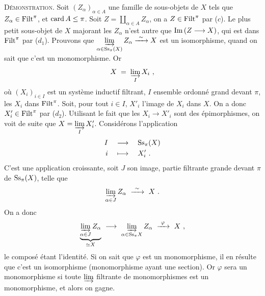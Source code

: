 \textsc{Démonstration}. Soit $(Z_{\alpha})_{\alpha\in A}$ une famille de sous-objets de $X$ tels que $Z_{\alpha} \in \mathrm{Filt}^{\pi}$, et $\operatorname{card} A \leq \pi$. Soit $Z = \coprod_{\alpha\in A} Z_{\alpha}$, on a $Z \in \mathrm{Filt}^{\pi}$ par ($c$). Le plus petit sous-objet de $X$ majorant les $Z_{\alpha}$ n'est autre que $\mathrm{Im}\, (Z \longrightarrow X)$, qui est dans $\mathrm{Filt}^{\pi}$ par ($d_1$). Prouvons que $\varinjlim\limits_{\alpha\in\mathrm{Ss}_{\pi}(X)} Z_{\alpha} \xrightarrow{\ \sim\ } X$ est un isomorphisme, quand on sait que c'est un monomorphisme. Or
\[
X \;=\; \varinjlim_{I} X_i \ ,
\]
où $(X_i)_{i\in I}$ est un système inductif filtrant, $I$ ensemble ordonné grand devant $\pi$, les $X_i$ dans $\mathrm{Filt}^{\pi}$. Soit, pour tout $i \in I$, $X'_i$ l'image de $X_i$ dans $X$. On a donc $X'_i \in \mathrm{Filt}^{\pi}$ par ($d_2$). Utilisant le fait que les $X_i \longrightarrow X'_i$ sont des épimorphismes, on voit de suite que $X = \varinjlim\limits_{I} X'_i$. Considérons l'application
\[
\begin{aligned}
I \quad &\longrightarrow \quad \mathrm{Ss}_{\pi}(X)\\
i \quad &\longmapsto \quad X'_i \ .
\end{aligned}
\]
C'est une application croissante, soit $J$ son image, partie filtrante grande devant $\pi$ de $\mathrm{Ss}_{\pi}(X)$, telle que
\[
\varinjlim_{\alpha\in J} Z_{\alpha} \ \xrightarrow{\ \sim\ } \ X \ .
\]
On a donc
\[
\underbrace{\varinjlim_{\alpha\in J} Z_{\alpha}}_{\simeq X} \ \longrightarrow \ \varinjlim_{\alpha\in\Ss_{\pi}X} Z_{\alpha} \ \xrightarrow{\ \varphi\ } \ X \ ,
\]
le composé étant l'identité. Si on sait que $\varphi$ est un monomorphisme, il en résulte que c'est un isomorphisme (monomorphisme ayant une section). Or $\varphi$ sera un monomorphisme si toute $\varinjlim$ filtrante de monomorphismes est un monomorphisme, et alors on gagne.

